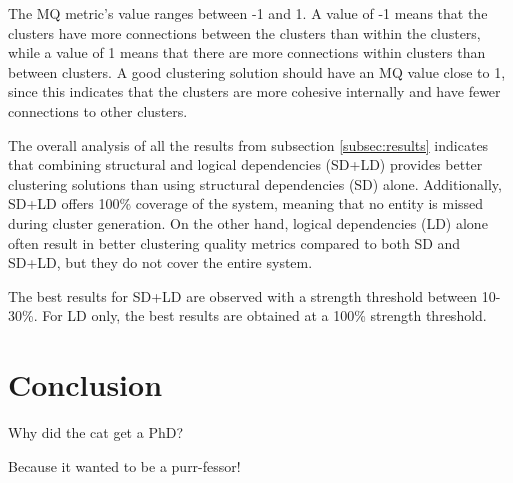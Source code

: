 \documentclass{ieeeaccess}
\begin{document}
The MQ metric's value ranges between -1 and 1. A value of -1 means that the clusters have more connections between the clusters than within the clusters, while a value of 1 means that there are more connections within clusters than between clusters. A good clustering solution should have an MQ value close to 1, since this indicates that the clusters are more cohesive internally and have fewer connections to other clusters.

The overall analysis of all the results from subsection \ref{subsec:results} indicates that combining structural and logical dependencies (SD+LD) provides better clustering solutions than using structural dependencies (SD) alone. Additionally, SD+LD offers 100\% coverage of the system, meaning that no entity is missed during cluster generation. On the other hand, logical dependencies (LD) alone often result in better clustering quality metrics compared to both SD and SD+LD, but they do not cover the entire system.

The best results for SD+LD are observed with a strength threshold between 10-30\%. For LD only, the best results are obtained at a 100\% strength threshold.

\section{Conclusion}
\label{sec:conclusion}
Why did the cat get a PhD?

Because it wanted to be a purr-fessor!
\end{document}
